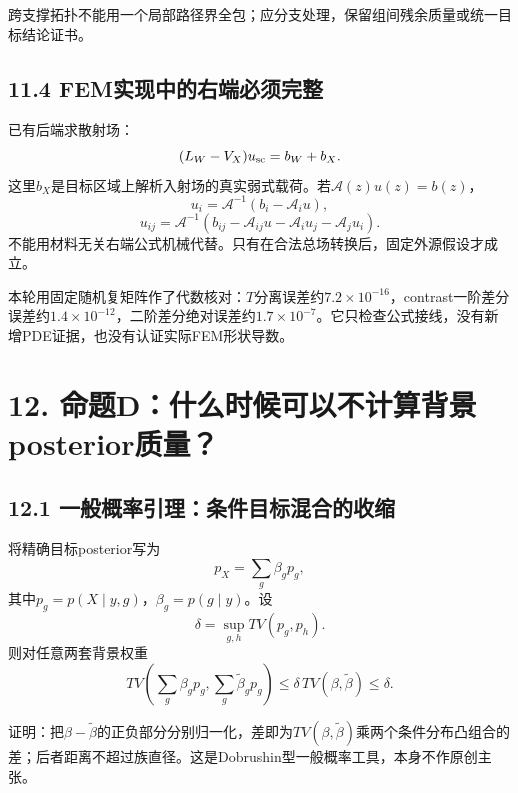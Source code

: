 \documentclass[
  10pt,
  a4paper,
]{article}
\begin{document}
跨支撑拓扑不能用一个局部路径界全包；应分支处理，保留组间残余质量或统一目标结论证书。

\hypertarget{femux5b9eux73b0ux4e2dux7684ux53f3ux7aefux5fc5ux987bux5b8cux6574}{%
\subsection{11.4
FEM实现中的右端必须完整}\label{femux5b9eux73b0ux4e2dux7684ux53f3ux7aefux5fc5ux987bux5b8cux6574}}

已有后端求散射场： \[
(L_W-V_X)u_{\rm sc}=b_W+b_X.
\]
这里\(b_X\)是目标区域上解析入射场的真实弱式载荷。若\(\mathcal A(z)u(z)=b(z)\)，
\[
u_i=\mathcal A^{-1}(b_i-\mathcal A_i u),
\] \[
u_{ij}=\mathcal A^{-1}
(b_{ij}-\mathcal A_{ij}u-\mathcal A_i u_j-\mathcal A_j u_i).
\]
不能用材料无关右端公式机械代替。只有在合法总场转换后，固定外源假设才成立。

本轮用固定随机复矩阵作了代数核对：\(T\)分离误差约\(7.2\times10^{-16}\)，contrast一阶差分误差约\(1.4\times10^{-12}\)，二阶差分绝对误差约\(1.7\times10^{-7}\)。它只检查公式接线，没有新增PDE证据，也没有认证实际FEM形状导数。

\hypertarget{ux547dux9898dux4ec0ux4e48ux65f6ux5019ux53efux4ee5ux4e0dux8ba1ux7b97ux80ccux666fposteriorux8d28ux91cf}{%
\section{12.
命题D：什么时候可以不计算背景posterior质量？}\label{ux547dux9898dux4ec0ux4e48ux65f6ux5019ux53efux4ee5ux4e0dux8ba1ux7b97ux80ccux666fposteriorux8d28ux91cf}}

\hypertarget{ux4e00ux822cux6982ux7387ux5f15ux7406ux6761ux4ef6ux76eeux6807ux6df7ux5408ux7684ux6536ux7f29}{%
\subsection{12.1
一般概率引理：条件目标混合的收缩}\label{ux4e00ux822cux6982ux7387ux5f15ux7406ux6761ux4ef6ux76eeux6807ux6df7ux5408ux7684ux6536ux7f29}}

将精确目标posterior写为 \[
p_X=\sum_g\beta_gp_g,
\] 其中\(p_g=p(X\mid y,g)\)，\(\beta_g=p(g\mid y)\)。设 \[
\delta=\sup_{g,h}TV(p_g,p_h).
\] 则对任意两套背景权重 \[
\boxed{
TV\left(\sum_g\beta_gp_g,\sum_g\widetilde\beta_gp_g\right)
\le\delta\,TV(\beta,\widetilde\beta)\le\delta.
}
\]

证明：把\(\beta-\widetilde\beta\)的正负部分分别归一化，差即为\(TV(\beta,\widetilde\beta)\)乘两个条件分布凸组合的差；后者距离不超过族直径。这是Dobrushin型一般概率工具，本身不作原创主张。
\end{document}

